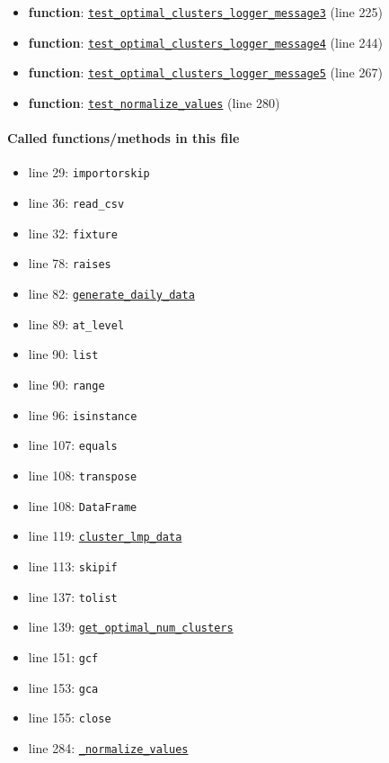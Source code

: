 \documentclass[11pt]{report}
\begin{document}
\begin{itemize}[leftmargin=*]
  \item \textbf{function}: \hyperref[def:pricetaker-tests-test_clustering.py:test_optimal_clusters_logger_message3:L225]{\texttt{test\_optimal\_clusters\_logger\_message3}} (line 225)
  \item \textbf{function}: \hyperref[def:pricetaker-tests-test_clustering.py:test_optimal_clusters_logger_message4:L244]{\texttt{test\_optimal\_clusters\_logger\_message4}} (line 244)
  \item \textbf{function}: \hyperref[def:pricetaker-tests-test_clustering.py:test_optimal_clusters_logger_message5:L267]{\texttt{test\_optimal\_clusters\_logger\_message5}} (line 267)
  \item \textbf{function}: \hyperref[def:pricetaker-tests-test_clustering.py:test_normalize_values:L280]{\texttt{test\_normalize\_values}} (line 280)
\end{itemize}
\paragraph{Called functions/methods in this file}
\begin{itemize}[leftmargin=*]
  \item line 29: \texttt{importorskip}
  \item line 36: \texttt{read\_csv}
  \item line 32: \texttt{fixture}
  \item line 78: \texttt{raises}
  \item line 82: \hyperref[def:pricetaker-clustering.py:generate_daily_data:L35]{\texttt{generate\_daily\_data}}
  \item line 89: \texttt{at\_level}
  \item line 90: \texttt{list}
  \item line 90: \texttt{range}
  \item line 96: \texttt{isinstance}
  \item line 107: \texttt{equals}
  \item line 108: \texttt{transpose}
  \item line 108: \texttt{DataFrame}
  \item line 119: \hyperref[def:pricetaker-clustering.py:cluster_lmp_data:L76]{\texttt{cluster\_lmp\_data}}
  \item line 113: \texttt{skipif}
  \item line 137: \texttt{tolist}
  \item line 139: \hyperref[def:pricetaker-clustering.py:get_optimal_num_clusters:L142]{\texttt{get\_optimal\_num\_clusters}}
  \item line 151: \texttt{gcf}
  \item line 153: \texttt{gca}
  \item line 155: \texttt{close}
  \item line 284: \hyperref[def:pricetaker-clustering.py:_normalize_values:L332]{\texttt{\_normalize\_values}}
\end{itemize}
\end{document}
